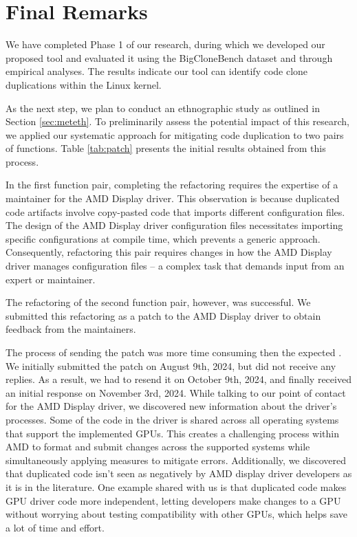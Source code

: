 \en

\section{Final Remarks}

We have completed Phase 1 of our research, during which we developed our proposed tool and evaluated it using the BigCloneBench dataset and through empirical analyses. The results indicate our tool can identify code clone duplications within the Linux kernel.

As the next step, we plan to conduct an ethnographic study as outlined in Section \ref{sec:meteth}. To preliminarily assess the potential impact of this research, we applied our systematic approach for mitigating code duplication to two pairs of functions. Table \ref{tab:patch} presents the initial results obtained from this process.



In the first function pair, completing the refactoring requires the expertise of a maintainer for the AMD Display driver. This observation is because duplicated code artifacts involve copy-pasted code that imports different configuration files. The design of the AMD Display driver configuration files necessitates importing specific configurations at compile time, which prevents a generic approach. Consequently, refactoring this pair requires changes in how the AMD Display driver manages configuration files -- a complex task that demands input from an expert or maintainer.

The refactoring of the second function pair, however, was successful. 
We submitted this refactoring as a patch to the AMD Display driver to obtain feedback 
from the maintainers. 

The process of sending the patch was more time consuming then the expected . We 
initially submitted the patch on August 9th, 2024, but did not receive any 
replies. As a result, we had to resend it on October 9th, 2024, and finally 
received an initial response on 
November 3rd, 2024. 
While talking to our point of contact for the AMD Display driver, we discovered 
new information about the driver's processes. Some of the code in the driver is 
shared across all operating systems that support the implemented GPUs. This creates 
a challenging process within AMD to format and submit changes across the supported 
systems while simultaneously applying measures to mitigate errors.
Additionally, we discovered that duplicated code isn’t seen as negatively by AMD 
display driver developers as it is in the literature. One example shared with us 
is that duplicated code makes GPU driver code more independent, letting developers 
make changes to a GPU without worrying about testing compatibility with other GPUs, 
which helps save a lot of time and effort.

